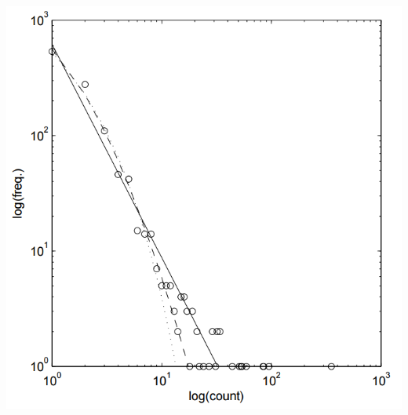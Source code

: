 \documentclass[11pt
              , a4paper
              , twoside
              , openright
              ]{report}
\begin{document}
\begin{center}
	\label{JavaSubclassDistribution}
	\includegraphics[scale=0.50]{SubclassDistributionJava.png}
\end{center}
\end{document}
